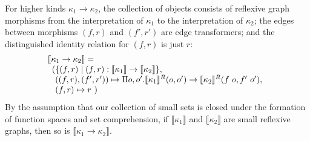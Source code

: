 \documentclass{sigplanconf}
\newcommand{\sepbar}{\mathrel|}
\theoremstyle{examplestyle}
\newcommand{\sem}[1]{\llbracket #1 \rrbracket}
\newcommand{\semKR}[1]{\llbracket #1 \rrbracket^R}
\begin{document}
For higher kinds $\kappa_1 \to \kappa_2$, the collection of objects
consists of reflexive graph morphisms from the interpretation of
$\kappa_1$ to the interpretation of $\kappa_2$; the edges between
morphisms $(f, r)$ and $(f', r')$ are edge transformers; and the
distinguished identity relation for $(f,r)$ is just $r$:
\begin{displaymath}
  \begin{array}{@{}l}
    \sem{\kappa_1 \to \kappa_2} = \\
    \begin{array}[t]{l@{}l@{}}
      (& \{ (f,r) \sepbar (f, r) : \sem{\kappa_1} \to \sem{\kappa_2} \},\\
      &((f,r),(f',r')) \mapsto \Pi o,o'. \semKR{\kappa_1}(o,o') \to \semKR{\kappa_2}(f~o, f'~o'), \\
      &(f,r) \mapsto r\ )
    \end{array}
  \end{array}
\end{displaymath}
By the assumption that our collection of small sets is closed under
the formation of function spaces and set comprehension, if
$\sem{\kappa_1}$ and $\sem{\kappa_2}$ are small reflexive graphs, then
so is $\sem{\kappa_1 \to \kappa_2}$.
\end{document}
